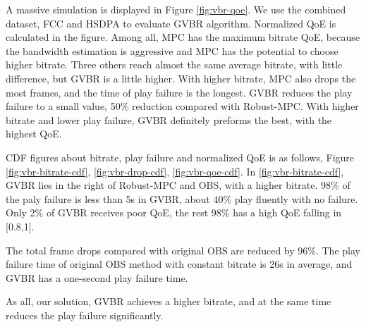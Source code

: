 A massive simulation is displayed in Figure \ref{fig:vbr-qoe}. We use the combined dataset, FCC and HSDPA to evaluate GVBR algorithm. Normalized QoE is calculated in the figure. Among all, MPC has the maximum bitrate QoE, because the bandwidth estimation is aggressive and MPC has the potential to choose higher bitrate. Three others reach almost the same average bitrate, with little difference, but GVBR is a little higher. With higher bitrate, MPC also drops the most frames, and the time of play failure is the longest. GVBR reduces the play failure to a small value, 50\% reduction compared with Robust-MPC. With higher bitrate and lower play failure, GVBR definitely preforms the best, with the highest QoE.

CDF figures about bitrate, play failure and normalized QoE is as follows, Figure \ref{fig:vbr-bitrate-cdf}, \ref{fig:vbr-drop-cdf}, \ref{fig:vbr-qoe-cdf}. In \ref{fig:vbr-bitrate-cdf}, GVBR lies in the right of Robust-MPC and OBS, with a higher bitrate. $98\%$ of the paly failure is less than 5s in GVBR, about 40\% play fluently with no failure. Only 2\% of GVBR receives poor QoE, the rest 98\% has a high QoE falling in [0.8,1].

The total frame drops compared with original OBS are reduced by 96\%. The play failure time of original OBS method with constant bitrate is 26s in average, and GVBR has a one-second play failure time.

As all, our solution, GVBR achieves a higher bitrate, and at the same time reduces the play failure significantly.

